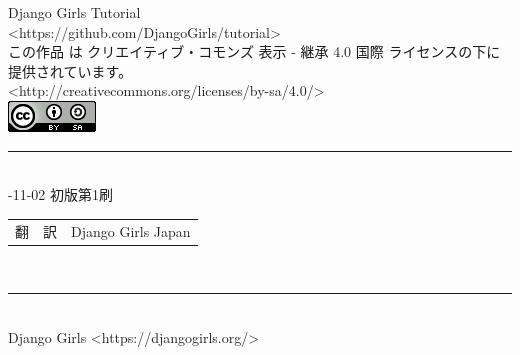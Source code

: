 \reviewcolophon
\thispagestyle{empty}

\vspace*{\fill}

{\noindent\reviewtitlefont\Large Django Girls Tutorial} \\
\medskip
{\noindent <https://github.com/DjangoGirls/tutorial>} \\
{\noindent この作品 は クリエイティブ・コモンズ 表示 - 継承 4.0 国際 ライセンスの下に提供されています。} \\
{\noindent <http://creativecommons.org/licenses/by-sa/4.0/>} \\

\includegraphics[]{./images/ccby.png}

\noindent\rule[8pt]{\textwidth}{1pt} \\
{-11-02 初版第1刷
}

\begin{tabular}{ll}
翻　訳 & Django Girls Japan \\

\end{tabular}
　\\
\rule[0pt]{\textwidth}{1pt} \\
{\noindent Django Girls <https://djangogirls.org/>} \\
